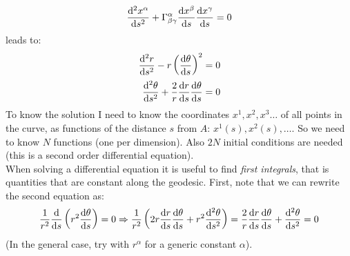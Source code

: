 \documentclass[../template.tex]{subfiles}
\begin{document}
\begin{example}
\begin{align*}
        \dv[2]{x^\alpha}{s} + \Gamma^\alpha_{\beta \gamma} \dv{x^\beta}{s } \dv{x^\gamma}{s} = 0
    \end{align*}
    leads to:
    \begin{align*}
        \dv[2]{r}{s} - r \left(\dv{\theta}{s}\right)^2 &= 0\\
        \dv[2]{\theta}{s} + \frac{2}{r} \dv{r}{s} \dv{\theta}{s} &= 0 
    \end{align*}
    To know the solution I need to know the coordinates $x^1, x^2, x^3 \dots$ of all points in the curve, as functions of the distance $s$ from $A$: $x^1(s), x^2(s), \dots$. So we need to know $N$ functions (one per dimension). Also $2N$ initial conditions are needed (this is a second order differential equation).\\
    
    When solving a differential equation it is useful to find \textit{first integrals}, that is quantities that are constant along the geodesic. First, note that we can rewrite the second equation as:
    \begin{align*}
        \frac{1}{r^2} \dv{s} \left(r^2 \dv{\theta}{s}\right) = 0 \Rightarrow \frac{1}{r^2}\left(2r \dv{r}{s} \dv{\theta}{s} + r^2 \dv[2]{\theta}{s}\right)  = \frac{2}{r}\dv{r}{s}\dv{\theta}{s} + \dv[2]{\theta}{s} = 0
    \end{align*} 
    (In the general case, try with $r^\alpha$ for a generic constant $\alpha$).\\


\end{example}
\end{document}
